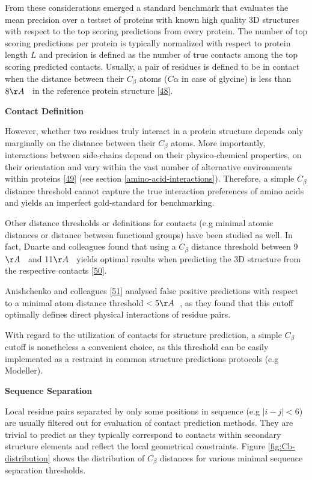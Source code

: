 \documentclass[12pt,a4paper,twoside]{book}
\newcommand{\Cb}{C_\beta}
\theoremstyle{definition}
\theoremstyle{definition}
\theoremstyle{remark}
\begin{document}
From these considerations emerged a standard benchmark that evaluates
the mean precision over a testset of proteins with known high quality 3D
structures with respect to the top scoring predictions from every
protein. The number of top scoring predictions per protein is typically
normalized with respect to protein length \(L\) and precision is defined
as the number of true contacts among the top scoring predicted contacts.
Usually, a pair of residues is defined to be in contact when the
distance between their \(\Cb\) atoms (\(C\alpha\) in case of glycine) is
less than \(8 \AA \; \;\) in the reference protein structure
{[}\protect\hyperlink{ref-Monastyrskyy2015}{48}{]}.

\textbf{Contact Definition}

However, whether two residues truly interact in a protein structure
depends only marginally on the distance between their \(\Cb\) atoms.
More importantly, interactions between side-chains depend on their
physico-chemical properties, on their orientation and vary within the
vast number of alternative environments within proteins
{[}\protect\hyperlink{ref-Bettsa}{49}{]} (see section
\ref{amino-acid-interactions}). Therefore, a simple \(\Cb\) distance
threshold cannot capture the true interaction preferences of amino acids
and yields an imperfect gold-standard for benchmarking.

Other distance thresholds or definitions for contacts (e.g minimal
atomic distances or distance between functional groups) have been
studied as well. In fact, Duarte and colleagues found that using a
\(\Cb\) distance threshold between 9\(\AA \; \;\) and 11\(\AA \; \;\)
yields optimal results when predicting the 3D structure from the
respective contacts {[}\protect\hyperlink{ref-Duarte2010}{50}{]}.

Anishchenko and colleagues
{[}\protect\hyperlink{ref-Anishchenko2017}{51}{]} analysed false
positive predictions with respect to a minimal atom distance threshold
\(< 5 \AA \; \;\), as they found that this cutoff optimally defines
direct physical interactions of residue pairs.

With regard to the utilization of contacts for structure prediction, a
simple \(\Cb\) cutoff is nonetheless a convenient choice, as this
threshold can be easily implemented as a restraint in common structure
predictions protocols (e.g Modeller).

\textbf{Sequence Separation}

Local residue pairs separated by only some positions in sequence (e.g
\(|i-j| < 6\)) are usually filtered out for evaluation of contact
prediction methods. They are trivial to predict as they typically
correspond to contacts within secondary structure elements and reflect
the local geometrical constraints. Figure \ref{fig:Cb-distribution}
shows the distribution of \(\Cb\) distances for various minimal sequence
separation thresholds.
\end{document}
